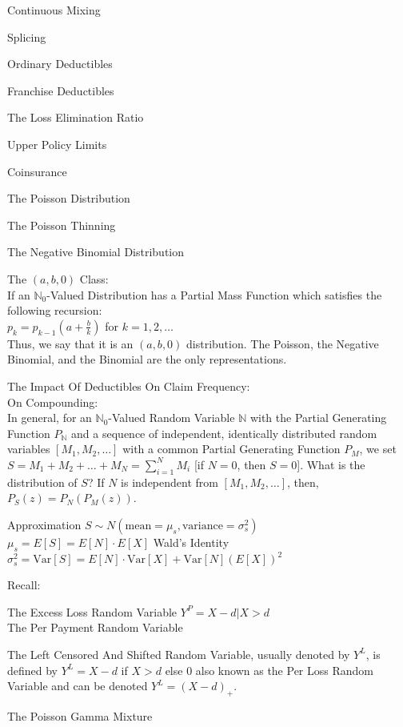 Continuous Mixing

Splicing

Ordinary Deductibles

Franchise Deductibles

The Loss Elimination Ratio

Upper Policy Limits

Coinsurance

The Poisson Distribution

The Poisson Thinning

The Negative Binomial Distribution

The $(a,b,0)$ Class: \\
If an $\mathbb{N}_0$-Valued Distribution has a Partial Mass Function which satisfies the following recursion: \\
$p_k = p_{k-1} \left( a + \frac{b}{k} \right)$ for $k=1,2,\dots$ \\
Thus, we say that it is an $(a,b,0)$ distribution. The Poisson, the Negative Binomial, and the Binomial are the only representations.

The Impact Of Deductibles On Claim Frequency: \\
On Compounding: \\
In general, for an $\mathbb{N}_0$-Valued Random Variable $\mathbb{N}$ with the Partial Generating Function $P_{\mathbb{N}}$ and a sequence of independent, identically distributed random variables $[M_1,M_2,\dots]$ with a common Partial Generating Function $P_M$, we set $S = M_1 + M_2 + \dots + M_N = \sum_{i=1}^N M_i$ [if $N=0$, then $S=0$]. What is the distribution of $S$? If $N$ is independent from $[M_1, M_2, \dots]$, then, $P_S (z) = P_N ( P_M(z) )$.

Approximation $S \sim N(\text{mean} = \mu_s,\text{variance} = \sigma_s^2)$ \\
$\mu_s = E[S] = E[N] \cdot E[X]$ Wald's Identity \\
$\sigma_s^2 = \text{Var}[S] = E[N] \cdot \text{Var}[X] + \text{Var}[N] (E[X])^2$

Recall:

The Excess Loss Random Variable $Y^P = X-d | X>d$ \\
The Per Payment Random Variable

The Left Censored And Shifted Random Variable, usually denoted by $Y^L$, is defined by $Y^L = X-d$ if $X>d$ else $0$ also known as the Per Loss Random Variable and can be denoted $Y^L = (X-d)_{+}$.

The Poisson Gamma Mixture

